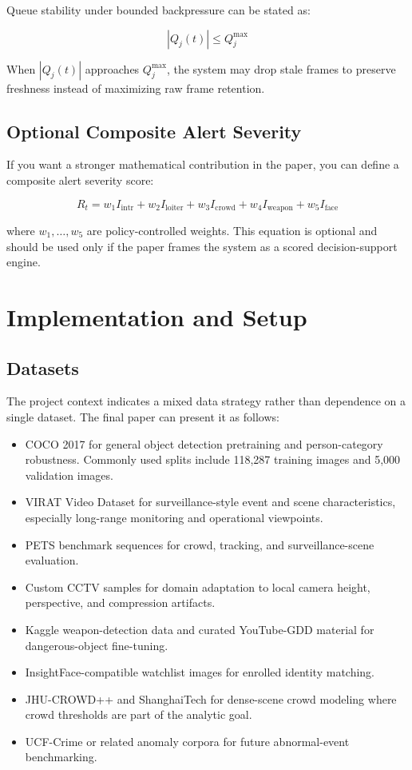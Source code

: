 \documentclass[11pt]{article}
\begin{document}
Queue stability under bounded backpressure can be stated as:

\begin{equation}
|Q_j(t)| \leq Q_j^{\max}
\end{equation}

When $|Q_j(t)|$ approaches $Q_j^{\max}$, the system may drop stale frames to preserve freshness instead of maximizing raw frame retention.

\subsection{Optional Composite Alert Severity}
If you want a stronger mathematical contribution in the paper, you can define a composite alert severity score:

\begin{equation}
R_t = w_1 I_{\mathrm{intr}} + w_2 I_{\mathrm{loiter}} + w_3 I_{\mathrm{crowd}} + w_4 I_{\mathrm{weapon}} + w_5 I_{\mathrm{face}}
\end{equation}

where $w_1, \ldots, w_5$ are policy-controlled weights. This equation is optional and should be used only if the paper frames the system as a scored decision-support engine.

\section{Implementation and Setup}

\subsection{Datasets}
The project context indicates a mixed data strategy rather than dependence on a single dataset. The final paper can present it as follows:

\begin{itemize}
\item COCO 2017 for general object detection pretraining and person-category robustness. Commonly used splits include 118,287 training images and 5,000 validation images.
\item VIRAT Video Dataset for surveillance-style event and scene characteristics, especially long-range monitoring and operational viewpoints.
\item PETS benchmark sequences for crowd, tracking, and surveillance-scene evaluation.
\item Custom CCTV samples for domain adaptation to local camera height, perspective, and compression artifacts.
\item Kaggle weapon-detection data and curated YouTube-GDD material for dangerous-object fine-tuning.
\item InsightFace-compatible watchlist images for enrolled identity matching.
\item JHU-CROWD++ and ShanghaiTech for dense-scene crowd modeling where crowd thresholds are part of the analytic goal.
\item UCF-Crime or related anomaly corpora for future abnormal-event benchmarking.
\end{itemize}
\end{document}
